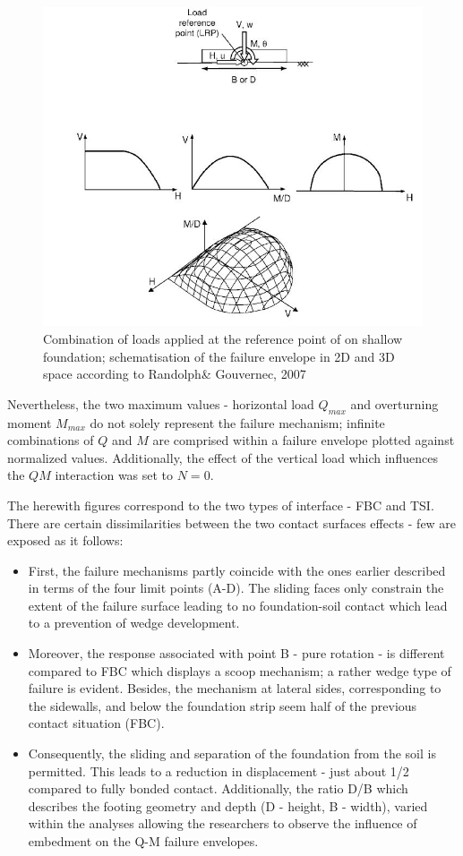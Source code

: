 \documentclass[11pt,a4paper]{report}
\begin{document}
\begin{figure}[h!]
	\centering
	\includegraphics[width=0.8\linewidth]{"failure"}
	\caption{Combination of loads applied at the reference point of on shallow foundation; schematisation of the failure envelope in 2D and 3D space according to Randolph\& Gouvernec, 2007 \cite{randolph2011offshore}} 
	\label{fail_contour}
\end{figure}

Nevertheless, the two maximum values - horizontal load $Q_{max}$ and overturning moment $M_{max}$ do not solely represent the failure mechanism; infinite combinations of $Q$ and $M$ are comprised within a failure envelope plotted against normalized values. Additionally, the effect of the vertical load which influences the $QM$ interaction was set to $N=0$.

The herewith figures correspond to the two types of interface - FBC and TSI. There are certain dissimilarities between the two contact surfaces effects - few are exposed as it follows:
\begin{itemize}
	\item First, the failure mechanisms partly coincide with the ones earlier described in terms of the four limit points (A-D). The sliding faces only constrain the extent of the failure surface leading to no foundation-soil contact which lead to a prevention of wedge development.
	\item Moreover, the response associated with point B - pure rotation - is different compared to FBC which displays a scoop mechanism; a rather wedge type of failure is evident. Besides, the mechanism at lateral sides, corresponding to the sidewalls, and below the foundation strip seem half of the previous contact situation (FBC).
	\item Consequently, the sliding and separation of the foundation from the soil is permitted. This leads to a reduction in displacement - just about 1/2 compared to fully bonded contact. Additionally, the ratio D/B which describes the footing geometry and depth (D - height, B - width), varied within the analyses allowing the researchers to observe the influence of embedment on the Q-M failure envelopes. 
\end{itemize}
\end{document}
